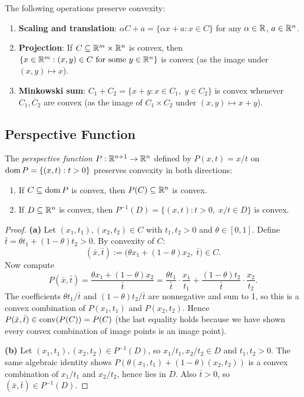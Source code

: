 \documentclass[11pt,a4paper]{article}
\begin{document}
\begin{corollary}
\label{cor:affine-ops}
The following operations preserve convexity:
\begin{enumerate}[label=(\roman*)]
  \item \textbf{Scaling and translation}: $\alpha C + a = \{\alpha x + a :
        x \in C\}$ for any $\alpha \in \mathbb{R}$, $a \in \mathbb{R}^n$.
  \item \textbf{Projection}: If $C \subseteq \mathbb{R}^m \times \mathbb{R}^n$ is convex,
        then $\{x \in \mathbb{R}^m : (x, y) \in C \text{ for some } y \in \mathbb{R}^n\}$ is
        convex (as the image under $(x,y) \mapsto x$).
  \item \textbf{Minkowski sum}: $C_1 + C_2 = \{x + y : x \in C_1,\; y \in
        C_2\}$ is convex whenever $C_1, C_2$ are convex (as the image of
        $C_1 \times C_2$ under $(x,y) \mapsto x + y$).
\end{enumerate}
\end{corollary}

\subsection{Perspective Function}

\begin{proposition}
\label{prop:perspective}
The \emph{perspective function} $P : \mathbb{R}^{n+1} \to \mathbb{R}^n$ defined by
$P(x, t) = x/t$ on $\operatorname{dom} P = \{(x,t) : t > 0\}$ preserves convexity in both
directions:
\begin{enumerate}[label=(\alph*)]
  \item If $C \subseteq \operatorname{dom} P$ is convex, then $P(C) \subseteq \mathbb{R}^n$ is
        convex.
  \item If $D \subseteq \mathbb{R}^n$ is convex, then
        $P^{-1}(D) = \{(x,t) : t > 0,\; x/t \in D\}$ is convex.
\end{enumerate}
\end{proposition}

\begin{proof}
\textbf{(a)}  Let $(x_1, t_1), (x_2, t_2) \in C$ with $t_1, t_2 > 0$ and
$\theta \in [0,1]$.  Define $\bar{t} = \theta t_1 + (1-\theta) t_2 > 0$.  By
convexity of $C$:
\[
  (\bar{x}, \bar{t})
  := \bigl(\theta x_1 + (1-\theta) x_2,\; \bar{t}\bigr) \in C.
\]
Now compute
\[
  P(\bar{x}, \bar{t})
  = \frac{\theta x_1 + (1-\theta) x_2}{\bar{t}}
  = \frac{\theta t_1}{\bar{t}} \cdot \frac{x_1}{t_1}
    + \frac{(1-\theta) t_2}{\bar{t}} \cdot \frac{x_2}{t_2}.
\]
The coefficients $\theta t_1 / \bar{t}$ and $(1-\theta) t_2 / \bar{t}$ are
nonnegative and sum to 1, so this is a convex combination of $P(x_1, t_1)$ and
$P(x_2, t_2)$.  Hence $P(\bar{x}, \bar{t}) \in \operatorname{conv}(P(C)) = P(C)$ (the last
equality holds because we have shown every convex combination of image points
is an image point).

\textbf{(b)}  Let $(x_1, t_1), (x_2, t_2) \in P^{-1}(D)$, so
$x_1/t_1, x_2/t_2 \in D$ and $t_1, t_2 > 0$.  The same algebraic identity
shows $P(\theta(x_1,t_1) + (1-\theta)(x_2,t_2))$ is a convex combination of
$x_1/t_1$ and $x_2/t_2$, hence lies in $D$.  Also $\bar{t} > 0$, so
$(\bar{x}, \bar{t}) \in P^{-1}(D)$.
\end{proof}
\end{document}
